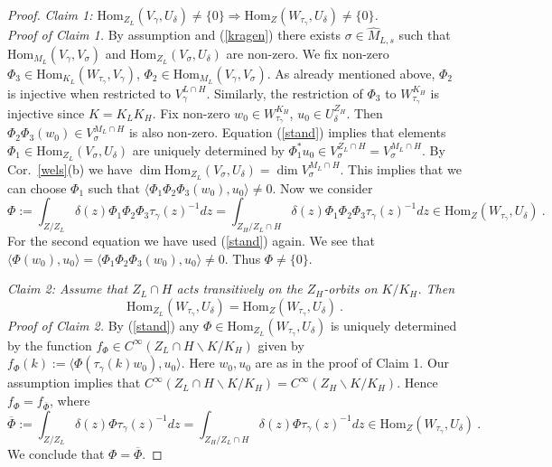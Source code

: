 \documentclass[10]{amsart}
\theoremstyle{remark}
\theoremstyle{definition}
\numberwithin{equation}{section}
\newcommand{\Hom}{\mathrm{Hom}}
\begin{document}
{\begin{proof}
{\it Claim 1: $\Hom_{Z_L}(V_\gamma,U_\delta)\ne\{0\}\Rightarrow \Hom_Z(W_{\tau_\gamma},U_\delta) \ne\{0\}$.}\\
{\it Proof of Claim 1.}  By assumption and (\ref{kragen}) there exists $\sigma\in \widehat M_{L,s}$ such that $\Hom_{M_L}(V_\gamma,V_\sigma)$ and $\Hom_{Z_L}(V_\sigma,U_\delta)$
are non-zero. We fix non-zero $\Phi_3\in \Hom_{K_L}(W_{\tau_\gamma},V_\gamma)$, $\Phi_2\in \Hom_{M_L}(V_\gamma, V_\sigma)$. As already mentioned above, $\Phi_2$ is  injective when restricted to $V_\gamma^{L\cap H}$. Similarly, the restriction of $\Phi_3$ to $W_{\tau_\gamma}^{K_H}$ is injective since $K=K_LK_H$. Fix non-zero 
$w_0\in W_{\tau_\gamma}^{K_H}$, $u_0\in U_\delta^{Z_H}$. Then $\Phi_2\Phi_3(w_0)\in V_\sigma^{M_L\cap H}$ is also non-zero. Equation (\ref{stand}) implies that elements $\Phi_1\in \Hom_{Z_L}(V_\sigma,U_\delta)$ are uniquely determined by $\Phi_1^*u_0\in V_\sigma^{Z_L\cap H}=V_\sigma^{M_L\cap H}$. By Cor.~\ref{wels}(b) we have $\dim \Hom_{Z_L}(V_\sigma,U_\delta)=\dim V_\sigma^{M_L\cap H}$. This implies that we can choose $\Phi_1$ such that $\langle \Phi_1\Phi_2\Phi_3(w_0),u_0\rangle\ne 0$. Now we consider
$$ \Phi:=\int_{Z/Z_L} \delta(z)\Phi_1\Phi_2\Phi_3\tau_\gamma(z)^{-1} dz = \int_{Z_H/Z_L\cap H} \delta(z)\Phi_1\Phi_2\Phi_3\tau_\gamma(z)^{-1} dz \in  
\Hom_Z(W_{\tau_\gamma},U_\delta) \ .$$
For the second equation we have used (\ref{stand}) again. We see that $\langle \Phi(w_0),u_0\rangle=\langle \Phi_1\Phi_2\Phi_3(w_0),u_0\rangle\ne 0$. Thus $\Phi\ne\{0\}$.

{\it Claim 2: Assume that $Z_L\cap H$ acts transitively on the $Z_H$-orbits on $K/K_H$. Then }
$$\Hom_{Z_L}(W_{\tau_\gamma},U_\delta)=\Hom_Z(W_{\tau_\gamma},U_\delta)\ .$$
{\it Proof of Claim 2.} By (\ref{stand}) any $\Phi\in\Hom_{Z_L}(W_{\tau_\gamma},U_\delta)$ is uniquely determined by the function 
$f_\Phi\in C^\infty(Z_L\cap H\backslash K/K_H)$ given by $f_\Phi(k):=\langle \Phi(\tau_\gamma(k) w_0),u_0\rangle$. Here $w_0,u_0$ are as in the proof of Claim 1.  Our assumption
implies that  $C^\infty(Z_L\cap H\backslash K/K_H)=C^\infty(Z_H\backslash K/K_H)$. Hence $f_\Phi=f_{\overline\Phi}$, where
$$ \overline\Phi:=\int_{Z/Z_L} \delta(z)\Phi\tau_\gamma(z)^{-1} dz = \int_{Z_H/Z_L\cap H} \delta(z)\Phi\tau_\gamma(z)^{-1} dz \in  
\Hom_Z(W_{\tau_\gamma},U_\delta) \ .$$
We conclude that $\Phi=\overline\Phi$.


\end{proof}}
\end{document}
